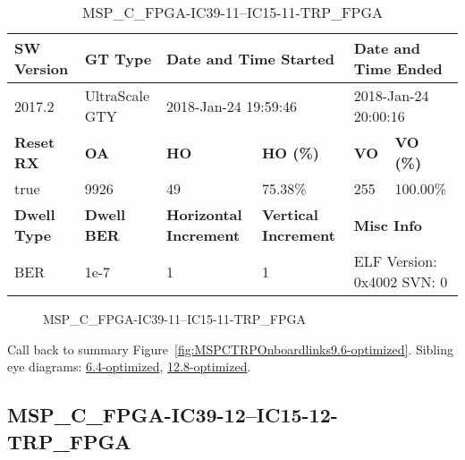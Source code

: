 \begin{table}[h]
\centering
\caption{MSP\_C\_FPGA-IC39-11--IC15-11-TRP\_FPGA}
\label{tab:MSPCFPGAIC3911IC1511TRPFPGA9.6-optimized}
\begin{tabular}{@{}|l|l|l|l|l|l|@{}}
\toprule
\textbf{SW Version}                & \textbf{GT Type}   & \multicolumn{2}{l|}{\textbf{Date and Time Started}}            & \multicolumn{2}{l|}{\textbf{Date and Time Ended}}        \\ \midrule
2017.2                       & UltraScale GTY          & \multicolumn{2}{l|}{2018-Jan-24 19:59:46}                   & \multicolumn{2}{l|}{2018-Jan-24 20:00:16}               \\ \midrule
\textbf{Reset RX}                  & \textbf{OA} & \textbf{HO}   & \textbf{HO (\%)} & \textbf{VO} & \textbf{VO (\%)} \\ \midrule
true & 9926        & 49          & 75.38\%        & 255        & 100.00\%       \\ \midrule
\textbf{Dwell Type}                & \textbf{Dwell BER} & \textbf{Horizontal Increment} & \textbf{Vertical Increment}    & \multicolumn{2}{l|}{\textbf{Misc Info}}                  \\ \midrule
BER                            & 1e-7        & 1        & 1           & \multicolumn{2}{l|}{ELF Version: 0x4002 SVN: 0}                         \\ \bottomrule
\end{tabular}
\end{table}

\begin{figure}[h]
\caption{MSP\_C\_FPGA-IC39-11--IC15-11-TRP\_FPGA} \label{fig:MSPCFPGAIC3911IC1511TRPFPGA9.6-optimized}
\end{figure}

Call back to summary Figure~\ref{fig:MSPCTRPOnboardlinks9.6-optimized}.
Sibling eye diagrams: \hyperref[sec:MSPCFPGAIC3911IC1511TRPFPGA6.4-optimized]{6.4-optimized}, \hyperref[sec:MSPCFPGAIC3911IC1511TRPFPGA12.8-optimized]{12.8-optimized}.

\clearpage
\newpage


\subsection{MSP\_C\_FPGA-IC39-12--IC15-12-TRP\_FPGA}\label{sec:MSPCFPGAIC3912IC1512TRPFPGA9.6-optimized}

